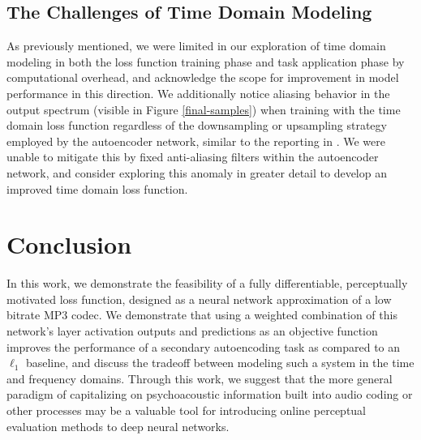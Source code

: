\documentclass[sigconf]{acmart}
\begin{document}
\subsection{The Challenges of Time Domain Modeling}
As previously mentioned, we were limited in our exploration of time domain modeling in both the loss function training phase and task application phase by computational overhead, and acknowledge the scope for improvement in model performance in this direction.  We additionally notice aliasing behavior in the output spectrum (visible in Figure \ref{final-samples}) when training with the time domain loss function regardless of the downsampling or upsampling strategy employed by the autoencoder network, similar to the reporting in \cite{kim2019adversarial}.  We were unable to mitigate this by fixed anti-aliasing filters within the autoencoder network, and consider exploring this anomaly in greater detail to develop an improved time domain loss function.

\section{Conclusion}

In this work, we demonstrate the feasibility of a fully differentiable, perceptually motivated loss function, designed as a neural network approximation of a low bitrate MP3 codec.  We demonstrate that using a weighted combination of this network's layer activation outputs and predictions as an objective function improves the performance of a secondary autoencoding task as compared to an $\ell_{1}$ baseline, and discuss the tradeoff between modeling such a system in the time and frequency domains.  Through this work, we suggest that the more general paradigm of capitalizing on psychoacoustic information built into audio coding or other processes may be a valuable tool for introducing online perceptual evaluation methods to deep neural networks.



\end{document}
